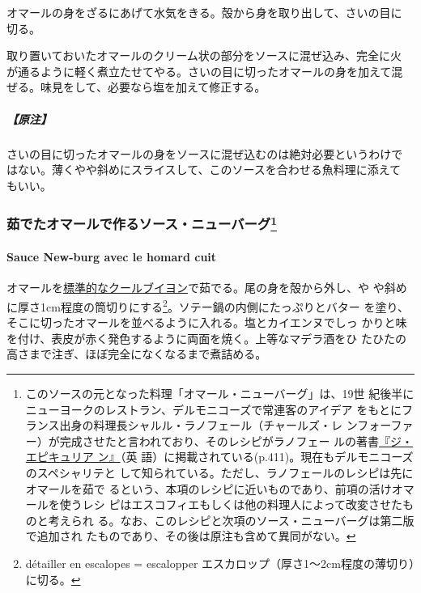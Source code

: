 \begin{recette}
オマールの身をざるにあげて水気をきる。殻から身を取り出して、さいの目に
切る。

取り置いておいたオマールのクリーム状の部分をソースに混ぜ込み、完全に火
が通るように軽く煮立たせてやる。さいの目に切ったオマールの身を加えて混
ぜる。味見をして、必要なら塩を加えて修正する。

\hypertarget{ux539fux6ce8-14}{%
\subparagraph{【原注】}\label{ux539fux6ce8-14}}

さいの目に切ったオマールの身をソースに混ぜ込むのは絶対必要というわけで
はない。薄くやや斜めにスライスして、このソースを合わせる魚料理に添えて
もいい。

\maeaki

\hypertarget{ux8339ux3067ux305fux30aaux30deux30fcux30ebux3067ux4f5cux308bux30bdux30fcux30b9ux30cbux30e5ux30fcux30d0ux30fcux30b0100}{%
\subsubsection[茹でたオマールで作るソース・ニューバーグ]{\texorpdfstring{茹でたオマールで作るソース・ニューバーグ\footnote{このソースの元となった料理「オマール・ニューバーグ」は、19世
  紀後半にニューヨークのレストラン、デルモニコーズで常連客のアイデア
  をもとにフランス出身の料理長シャルル・ラノフェール（チャールズ・レ
  ンフォーファー）が完成させたと言われており、そのレシピがラノフェー
  ルの著書\href{https://archive.org/details/epicureancomplet00ranhrich}{『ジ・エピキュリア
  ン』}（英
  語）に掲載されている(p.411)。現在もデルモニコーズのスペシャリテと
  して知られている。ただし、ラノフェールのレシピは先にオマールを茹で
  るという、本項のレシピに近いものであり、前項の活けオマールを使うレシ
  ピはエスコフィエもしくは他の料理人によって改変させたものと考えられ
  る。なお、このレシピと次項のソース・ニューバーグは第二版で追加され
  たものであり、その後は原注も含めて異同がない。}}{茹でたオマールで作るソース・ニューバーグ}}\label{ux8339ux3067ux305fux30aaux30deux30fcux30ebux3067ux4f5cux308bux30bdux30fcux30b9ux30cbux30e5ux30fcux30d0ux30fcux30b0100}}

\hypertarget{sauce-new-burg-avec-le-homard-cuit}{%
\paragraph{Sauce New-burg avec le homard
cuit}\label{sauce-new-burg-avec-le-homard-cuit}}

オマールを\protect\hyperlink{}{標準的なクールブイヨン}で茹でる。尾の身を殻から外し、や
や斜めに厚さ1cm程度の筒切りにする\footnote{détailler en escalopes =
  escalopper エスカロップ（厚さ1〜2cm程度の薄切り）に切る。}。ソテー鍋の内側にたっぷりとバター
を塗り、そこに切ったオマールを並べるように入れる。塩とカイエンヌでしっ
かりと味を付け、表皮が赤く発色するように両面を焼く。上等なマデラ酒をひ
たひたの高さまで注ぎ、ほぼ完全になくなるまで煮詰める。


\end{recette}
